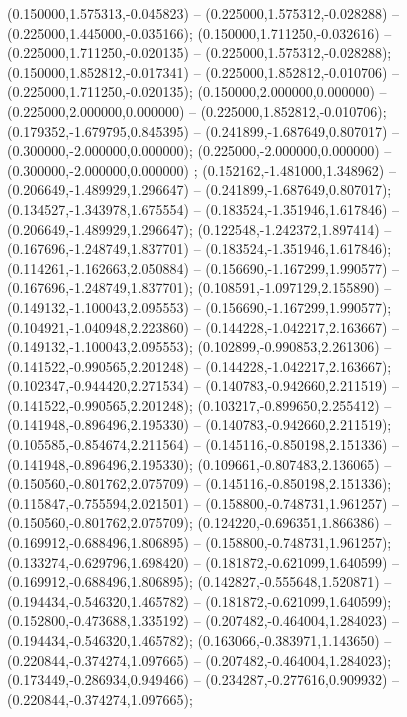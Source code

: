  (0.150000,1.575313,-0.045823) -- (0.225000,1.575312,-0.028288) -- (0.225000,1.445000,-0.035166);
 (0.150000,1.711250,-0.032616) -- (0.225000,1.711250,-0.020135) -- (0.225000,1.575312,-0.028288);
 (0.150000,1.852812,-0.017341) -- (0.225000,1.852812,-0.010706) -- (0.225000,1.711250,-0.020135);
 (0.150000,2.000000,0.000000) -- (0.225000,2.000000,0.000000) -- (0.225000,1.852812,-0.010706);
 (0.179352,-1.679795,0.845395) -- (0.241899,-1.687649,0.807017) -- (0.300000,-2.000000,0.000000);
 (0.225000,-2.000000,0.000000) -- (0.300000,-2.000000,0.000000) ;
 (0.152162,-1.481000,1.348962) -- (0.206649,-1.489929,1.296647) -- (0.241899,-1.687649,0.807017);
 (0.134527,-1.343978,1.675554) -- (0.183524,-1.351946,1.617846) -- (0.206649,-1.489929,1.296647);
 (0.122548,-1.242372,1.897414) -- (0.167696,-1.248749,1.837701) -- (0.183524,-1.351946,1.617846);
 (0.114261,-1.162663,2.050884) -- (0.156690,-1.167299,1.990577) -- (0.167696,-1.248749,1.837701);
 (0.108591,-1.097129,2.155890) -- (0.149132,-1.100043,2.095553) -- (0.156690,-1.167299,1.990577);
 (0.104921,-1.040948,2.223860) -- (0.144228,-1.042217,2.163667) -- (0.149132,-1.100043,2.095553);
 (0.102899,-0.990853,2.261306) -- (0.141522,-0.990565,2.201248) -- (0.144228,-1.042217,2.163667);
 (0.102347,-0.944420,2.271534) -- (0.140783,-0.942660,2.211519) -- (0.141522,-0.990565,2.201248);
 (0.103217,-0.899650,2.255412) -- (0.141948,-0.896496,2.195330) -- (0.140783,-0.942660,2.211519);
 (0.105585,-0.854674,2.211564) -- (0.145116,-0.850198,2.151336) -- (0.141948,-0.896496,2.195330);
 (0.109661,-0.807483,2.136065) -- (0.150560,-0.801762,2.075709) -- (0.145116,-0.850198,2.151336);
 (0.115847,-0.755594,2.021501) -- (0.158800,-0.748731,1.961257) -- (0.150560,-0.801762,2.075709);
 (0.124220,-0.696351,1.866386) -- (0.169912,-0.688496,1.806895) -- (0.158800,-0.748731,1.961257);
 (0.133274,-0.629796,1.698420) -- (0.181872,-0.621099,1.640599) -- (0.169912,-0.688496,1.806895);
 (0.142827,-0.555648,1.520871) -- (0.194434,-0.546320,1.465782) -- (0.181872,-0.621099,1.640599);
 (0.152800,-0.473688,1.335192) -- (0.207482,-0.464004,1.284023) -- (0.194434,-0.546320,1.465782);
 (0.163066,-0.383971,1.143650) -- (0.220844,-0.374274,1.097665) -- (0.207482,-0.464004,1.284023);
 (0.173449,-0.286934,0.949466) -- (0.234287,-0.277616,0.909932) -- (0.220844,-0.374274,1.097665);
